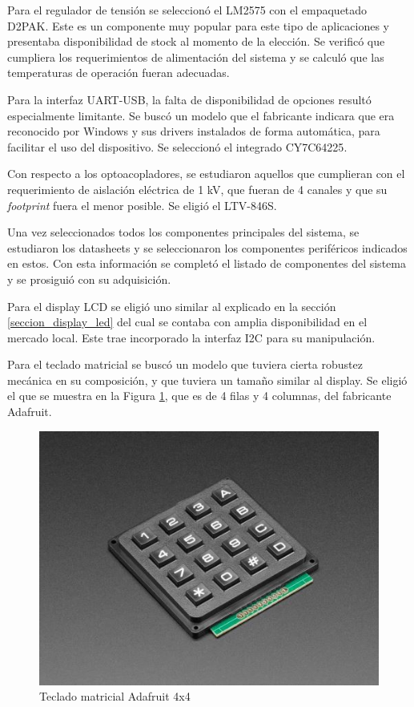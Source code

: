 Para el regulador de tensión se seleccionó el LM2575\citep{web_LM2575} con el empaquetado D2PAK. Este es un componente muy popular para este tipo de aplicaciones y presentaba disponibilidad de stock al momento de la elección. Se verificó que cumpliera los requerimientos de alimentación del sistema y se calculó que las temperaturas de operación fueran adecuadas.

Para la interfaz UART-USB, la falta de disponibilidad de opciones resultó especialmente limitante. Se buscó un modelo que el fabricante indicara que era reconocido por Windows y sus drivers instalados de forma automática, para facilitar el uso del dispositivo. Se seleccionó el integrado CY7C64225\citep{web_interfaz_USB_UART}.

Con respecto a los optoacopladores, se estudiaron aquellos que cumplieran con el requerimiento de aislación eléctrica de 1 kV, que fueran de 4 canales y que su \textit{footprint} fuera el menor posible. Se eligió el LTV-846S\citep{web_optoacopladores_LTV}.

Una vez seleccionados todos los componentes principales del sistema, se estudiaron los datasheets y se seleccionaron los componentes periféricos indicados en estos. Con esta información se completó el listado de componentes del sistema y se prosiguió con su adquisición.

Para el display LCD se eligió uno similar al explicado en la sección \ref{seccion_display_led} del cual se contaba con amplia disponibilidad en el mercado local. Este trae incorporado la interfaz I2C para su manipulación.

Para el teclado matricial se buscó un modelo que tuviera cierta robustez mecánica en su composición, y que tuviera un tamaño similar al display. Se eligió el que se muestra en la Figura \ref{fig:keypad}, que es de 4 filas y 4 columnas, del fabricante Adafruit\citep{web_adafruit}.

\begin{figure}[htbp]
	\centering
	\includegraphics[scale=.8]{./Figures/keypad.JPG}
	\caption{Teclado matricial Adafruit 4x4\citep{web_keypad}}
	\label{fig:keypad}
\end{figure}



